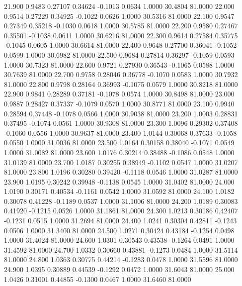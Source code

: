   21.900   0.9483   0.27107   0.34624  -0.1013   0.0634   1.0000  30.4804  81.0000
  22.000   0.9514   0.27229   0.34925  -0.1022   0.0626   1.0000  30.5316  81.0000
  22.100   0.9547   0.27349   0.35218  -0.1030   0.0618   1.0000  30.5785  81.0000
  22.200   0.9580   0.27467   0.35501  -0.1038   0.0611   1.0000  30.6216  81.0000
  22.300   0.9614   0.27584   0.35775  -0.1045   0.0605   1.0000  30.6614  81.0000
  22.400   0.9648   0.27700   0.36041  -0.1052   0.0599   1.0000  30.6982  81.0000
  22.500   0.9684   0.27814   0.36297  -0.1059   0.0593   1.0000  30.7323  81.0000
  22.600   0.9721   0.27930   0.36543  -0.1065   0.0588   1.0000  30.7639  81.0000
  22.700   0.9758   0.28046   0.36778  -0.1070   0.0583   1.0000  30.7932  81.0000
  22.800   0.9798   0.28164   0.36993  -0.1075   0.0579   1.0000  30.8218  81.0000
  22.900   0.9841   0.28289   0.37181  -0.1078   0.0574   1.0000  30.8498  81.0000
  23.000   0.9887   0.28427   0.37337  -0.1079   0.0570   1.0000  30.8771  81.0000
  23.100   0.9940   0.28594   0.37448  -0.1078   0.0566   1.0000  30.9038  81.0000
  23.200   1.0003   0.28831   0.37495  -0.1074   0.0561   1.0000  30.9308  81.0000
  23.300   1.0096   0.29302   0.37408  -0.1060   0.0556   1.0000  30.9637  81.0000
  23.400   1.0144   0.30068   0.37633  -0.1058   0.0550   1.0000  31.0036  81.0000
  23.500   1.0164   0.30158   0.38040  -0.1071   0.0549   1.0000  31.0082  81.0000
  23.600   1.0176   0.30214   0.38488  -0.1086   0.0548   1.0000  31.0139  81.0000
  23.700   1.0187   0.30255   0.38949  -0.1102   0.0547   1.0000  31.0207  81.0000
  23.800   1.0196   0.30280   0.39420  -0.1118   0.0546   1.0000  31.0287  81.0000
  23.900   1.0195   0.30242   0.39948  -0.1138   0.0545   1.0000  31.0402  81.0000
  24.000   1.0190   0.30171   0.40534  -0.1161   0.0542   1.0000  31.0592  81.0000
  24.100   1.0182   0.30078   0.41228  -0.1189   0.0537   1.0000  31.1006  81.0000
  24.200   1.0189   0.30083   0.41920  -0.1215   0.0526   1.0000  31.1861  81.0000
  24.300   1.0213   0.30186   0.42407  -0.1231   0.0515   1.0000  31.2694  81.0000
  24.400   1.0241   0.30304   0.42811  -0.1243   0.0506   1.0000  31.3400  81.0000
  24.500   1.0271   0.30424   0.43184  -0.1254   0.0498   1.0000  31.4024  81.0000
  24.600   1.0301   0.30543   0.43538  -0.1264   0.0491   1.0000  31.4592  81.0000
  24.700   1.0332   0.30660   0.43881  -0.1273   0.0484   1.0000  31.5114  81.0000
  24.800   1.0363   0.30775   0.44214  -0.1283   0.0478   1.0000  31.5596  81.0000
  24.900   1.0395   0.30889   0.44539  -0.1292   0.0472   1.0000  31.6043  81.0000
  25.000   1.0426   0.31001   0.44855  -0.1300   0.0467   1.0000  31.6460  81.0000
